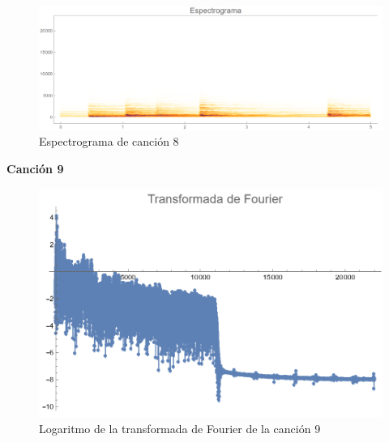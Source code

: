 \documentclass[12pt, letterpaper]{article}
\begin{document}
\begin{figure}[H]
  \centering
  \includegraphics[width=.9\linewidth]{imgs/Cancion8/espectrograma.png}
  \caption{Espectrograma de canción 8}
  \label{fig:08i}
\end{figure}

\textbf{\large{Canción 9}}
\begin{figure}[H]
  \centering
  \includegraphics[width=0.7\linewidth]{imgs/Cancion9/transformada.png}
  \caption{Logaritmo de la transformada de Fourier de la canción 9}
  \label{fig:09a}
\end{figure}
\end{document}
